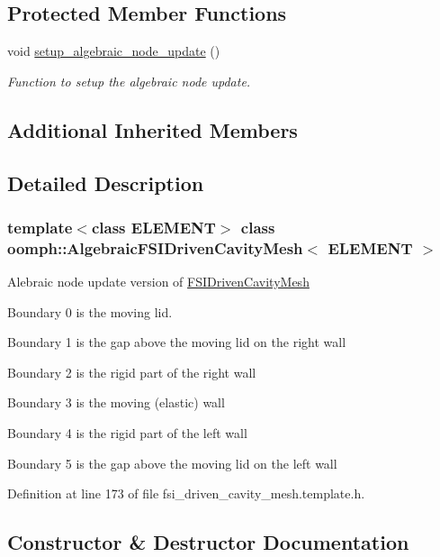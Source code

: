 \subsection*{Protected Member Functions}
\begin{DoxyCompactItemize}
\item 
void \hyperlink{classoomph_1_1AlgebraicFSIDrivenCavityMesh_a7f6b7c3dae1c61c2cdb0cbd229173114}{setup\+\_\+algebraic\+\_\+node\+\_\+update} ()
\begin{DoxyCompactList}\small\item\em Function to setup the algebraic node update. \end{DoxyCompactList}\end{DoxyCompactItemize}
\subsection*{Additional Inherited Members}


\subsection{Detailed Description}
\subsubsection*{template$<$class E\+L\+E\+M\+E\+NT$>$\newline
class oomph\+::\+Algebraic\+F\+S\+I\+Driven\+Cavity\+Mesh$<$ E\+L\+E\+M\+E\+N\+T $>$}

Alebraic node update version of \hyperlink{classoomph_1_1FSIDrivenCavityMesh}{F\+S\+I\+Driven\+Cavity\+Mesh}
\begin{DoxyItemize}
\item Boundary 0 is the moving lid.
\item Boundary 1 is the gap above the moving lid on the right wall
\item Boundary 2 is the rigid part of the right wall
\item Boundary 3 is the moving (elastic) wall
\item Boundary 4 is the rigid part of the left wall
\item Boundary 5 is the gap above the moving lid on the left wall 
\end{DoxyItemize}

Definition at line 173 of file fsi\+\_\+driven\+\_\+cavity\+\_\+mesh.\+template.\+h.



\subsection{Constructor \& Destructor Documentation}
\mbox{\label{classoomph_1_1AlgebraicFSIDrivenCavityMesh_a973ccadc769d98fed6bc9dd4eff32083}} 
